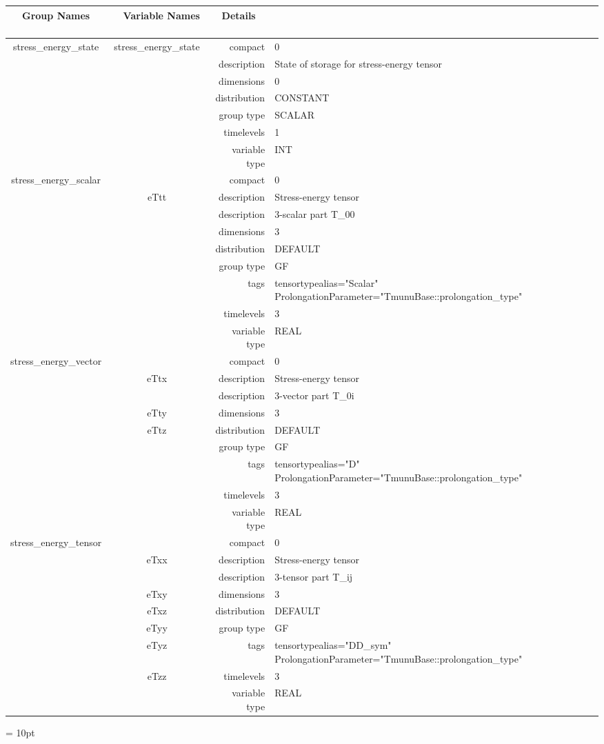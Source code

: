 \begin{tabular*}{150mm}{|c|c@{\extracolsep{\fill}}|rl|} \hline 
~ {\bf Group Names} ~ & ~ {\bf Variable Names} ~  &{\bf Details} ~ & ~\\ 
\hline 
stress\_energy\_state & stress\_energy\_state & compact & 0 \\ 
 &  & description & State of storage for stress-energy tensor \\ 
 &  & dimensions & 0 \\ 
 &  & distribution & CONSTANT \\ 
 &  & group type & SCALAR \\ 
 &  & timelevels & 1 \\ 
 &  & variable type & INT \\ 
\hline 
stress\_energy\_scalar &  & compact & 0 \\ 
 & eTtt & description & Stress-energy tensor \\ 
& ~ & description &  3-scalar part T\_00 \\ 
 &  & dimensions & 3 \\ 
 &  & distribution & DEFAULT \\ 
 &  & group type & GF \\ 
 &  & tags & tensortypealias="Scalar" ProlongationParameter="TmunuBase::prolongation\_type" \\ 
 &  & timelevels & 3 \\ 
 &  & variable type & REAL \\ 
\hline 
stress\_energy\_vector &  & compact & 0 \\ 
 & eTtx & description & Stress-energy tensor \\ 
& ~ & description &  3-vector part T\_0i \\ 
 & eTty & dimensions & 3 \\ 
 & eTtz & distribution & DEFAULT \\ 
 &  & group type & GF \\ 
 &  & tags & tensortypealias="D" ProlongationParameter="TmunuBase::prolongation\_type" \\ 
 &  & timelevels & 3 \\ 
 &  & variable type & REAL \\ 
\hline 
stress\_energy\_tensor &  & compact & 0 \\ 
 & eTxx & description & Stress-energy tensor \\ 
& ~ & description &  3-tensor part T\_ij \\ 
 & eTxy & dimensions & 3 \\ 
 & eTxz & distribution & DEFAULT \\ 
 & eTyy & group type & GF \\ 
 & eTyz & tags & tensortypealias="DD\_sym" ProlongationParameter="TmunuBase::prolongation\_type" \\ 
 & eTzz & timelevels & 3 \\ 
 &  & variable type & REAL \\ 
\hline 
\end{tabular*} 



\vspace{5mm}\parskip = 10pt 
